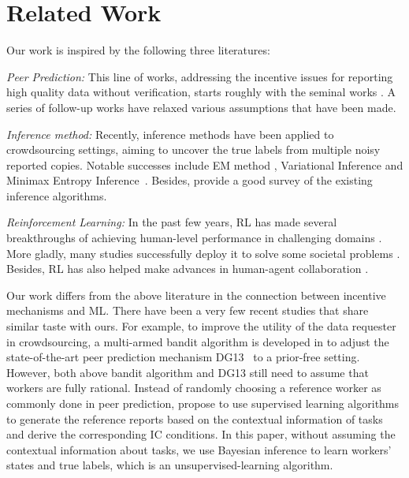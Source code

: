 \section{Related Work}
Our work is inspired by the following three literatures:

\emph{Peer Prediction:} This line of works, addressing the incentive issues for reporting high quality data without verification, starts roughly with the seminal works \cite{prelec2004bayesian,gneiting2007strictly}. A series of follow-up works have relaxed various assumptions that have been made\cite{jurca2009mechanisms,witkowski2012peer,radanovic2013robust,dasgupta2013crowdsourced}. 

\emph{Inference method:} Recently, inference methods have been applied to crowdsourcing settings, aiming to uncover the true labels from multiple noisy reported copies. Notable successes include EM method \cite{dawid1979maximum,raykar2010learning,zhang2014spectral}, Variational Inference \cite{liu2012variational,chen2015statistical} and Minimax Entropy Inference~\cite{zhou2012learning,zhou2014aggregating}. Besides, \citet{zheng2017truth} provide a good survey of the existing inference algorithms.

\emph{Reinforcement Learning:} In the past few years, %
RL has made several breakthroughs of achieving human-level performance in challenging domains \citep{Mnih15,Hasselt2016DeepRL,Silver17}. More gladly, many studies successfully deploy it to solve some societal problems \citep{Yu2013EmotionalMR,Leibo2017}. Besides, RL has also helped make advances in human-agent collaboration \citep{Sadhu2016ArgusSH,Wang2017}.


Our work differs from the above literature in the connection between incentive mechanisms and ML. There have been a very few recent studies that share similar taste with ours.
For example, to improve the utility of the data requester in crowdsourcing, a multi-armed bandit algorithm is developed in \citet{liu2017sequential} to adjust the state-of-the-art peer prediction mechanism DG13~\cite{dasgupta2013crowdsourced} to a prior-free setting.
However, both above bandit algorithm and DG13 still need to assume that workers are fully rational.
Instead of randomly choosing a reference worker as commonly done in peer prediction, \citet{liu2017machine} propose to use supervised learning algorithms to generate the reference reports based on the contextual information of tasks and derive the corresponding IC conditions.
In this paper, without assuming the contextual information about tasks, we use Bayesian inference to learn workers' states and true labels, which is an unsupervised-learning algorithm.

